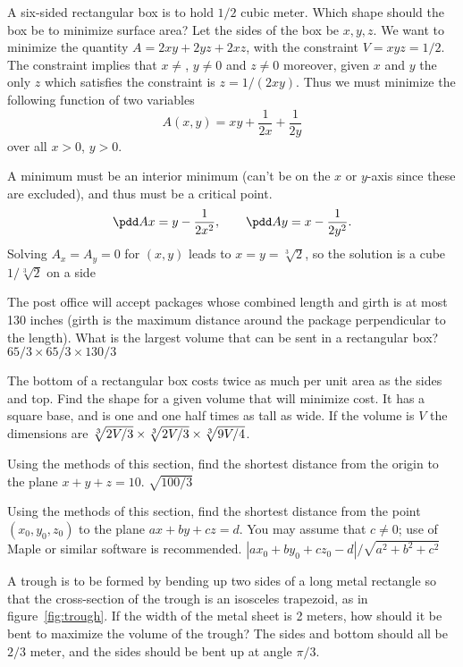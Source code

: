 \problem A six-sided rectangular box is to hold $1/2$ cubic meter.  Which
shape should the box be to minimize surface area?
\answer
Let the sides of the box be $x,y,z$.  We want to minimize the quantity $A =
2xy+2yz+2xz$, with the constraint $V=xyz=1/2$.  The constraint implies that
$x\neq$, $y\neq0$ and $z\neq0$ moreover, given $x$ and $y$ the only $z$
which satisfies the constraint is $z=1/(2xy)$.  Thus we must minimize the
following function of two variables
\[
A(x,y) = xy + \frac{1} {2x} + \frac{1} {2y}
\]
over all $x>0$, $y>0$.

A minimum must be an interior minimum (can't be on the $x$ or $y$-axis
since these are excluded), and thus must be a critical point.
\[
\pdd Ax = y-\frac{1} {2x^2}, \qquad
\pdd Ay = x - \frac{1} {2y^2}.
\]
Solving $A_x=A_y=0$ for $(x,y)$ leads to $x=y=\sqrt[3]2$, so the solution
is a cube $1/\sqrt[3]{2}$ on a side
\endanswer

\problem The post office will accept packages whose combined length and
girth is at most 130 inches (girth is the maximum distance around the
package perpendicular to the length). What is the largest volume that can
be sent in a rectangular box? 
\answer  $65/3\times 65/3\times 130/3$
\endanswer

\problem The bottom of a rectangular box costs twice as much per unit area
as the sides and top. Find the shape for a given volume that will minimize
cost. 
\answer  It has a square base, and is one and one half times as tall
as wide.  If the volume is $V$ the dimensions are $\root 3 \of {2V/3}\times
\root 3 \of {2V/3}\times \root 3\of {9V/4}$.
\endanswer

\problem Using the methods of this section, find the shortest distance from
the origin to the plane $x+y+z=10$. 
\answer  $\sqrt{100/3}$
\endanswer

\problem Using the methods of this section, find the shortest distance from
the point $(x_0,y_0,z_0)$ to the plane $ax+by+cz=d$.  You may assume that
$c\not=0$; use of Maple or similar software is recommended. 
\answer 
$|ax_0+by_0+cz_0-d|/\sqrt{a^2+b^2+c^2}$
\endanswer

\problem A trough is to be formed by bending up two sides of a long metal
rectangle so that the cross-section of the trough is an isosceles
trapezoid, as in figure~\ref{fig:trough}. If the width of the metal sheet
is 2 meters, how should it be bent to maximize the volume of the trough?
\answer The sides and bottom should all be $2/3$ meter, and the sides
should be bent up at angle $\pi/3$.
\endanswer

